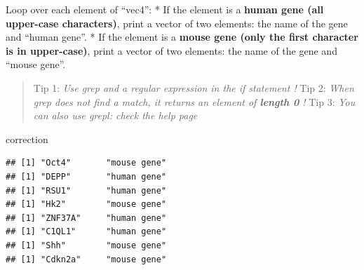 \documentclass[]{book}
\newenvironment{Shaded}{\begin{snugshade}}{\end{snugshade}}
\newcommand{\ControlFlowTok}[1]{\textcolor[rgb]{0.13,0.29,0.53}{\textbf{#1}}}
\newcommand{\DataTypeTok}[1]{\textcolor[rgb]{0.13,0.29,0.53}{#1}}
\newcommand{\DecValTok}[1]{\textcolor[rgb]{0.00,0.00,0.81}{#1}}
\newcommand{\KeywordTok}[1]{\textcolor[rgb]{0.13,0.29,0.53}{\textbf{#1}}}
\newcommand{\NormalTok}[1]{#1}
\newcommand{\OperatorTok}[1]{\textcolor[rgb]{0.81,0.36,0.00}{\textbf{#1}}}
\newcommand{\StringTok}[1]{\textcolor[rgb]{0.31,0.60,0.02}{#1}}
\begin{document}
Loop over each element of ``vec4'':
* If the element is a \textbf{human gene (all upper-case characters)}, print a vector of two elements: the name of the gene and ``human gene''.
* If the element is a \textbf{mouse gene (only the first character is in upper-case)}, print a vector of two elements: the name of the gene and ``mouse gene''.

\begin{quote}
Tip 1: \emph{Use grep and a regular expression in the if statement !}
Tip 2: \emph{When grep does not find a match, it returns an element of \textbf{length 0} !}
Tip 3: \emph{You can also use grepl: check the help page}
\end{quote}

correction

\begin{Shaded}
\end{Shaded}

\begin{verbatim}
## [1] "Oct4"       "mouse gene"
## [1] "DEPP"       "human gene"
## [1] "RSU1"       "human gene"
## [1] "Hk2"        "mouse gene"
## [1] "ZNF37A"     "human gene"
## [1] "C1QL1"      "human gene"
## [1] "Shh"        "mouse gene"
## [1] "Cdkn2a"     "mouse gene"
\end{verbatim}
\end{document}
